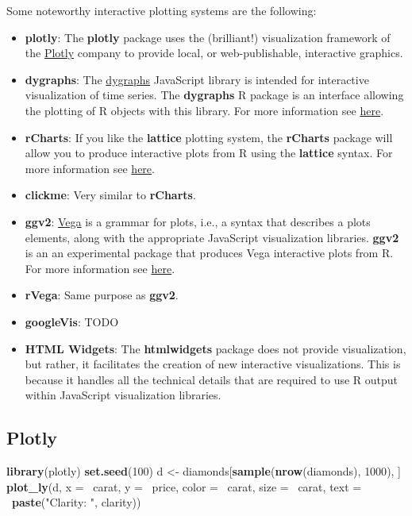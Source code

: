 \documentclass[]{book}
\newenvironment{Shaded}{\begin{snugshade}}{\end{snugshade}}
\newcommand{\KeywordTok}[1]{\textcolor[rgb]{0.13,0.29,0.53}{\textbf{{#1}}}}
\newcommand{\DataTypeTok}[1]{\textcolor[rgb]{0.13,0.29,0.53}{{#1}}}
\newcommand{\DecValTok}[1]{\textcolor[rgb]{0.00,0.00,0.81}{{#1}}}
\newcommand{\StringTok}[1]{\textcolor[rgb]{0.31,0.60,0.02}{{#1}}}
\newcommand{\NormalTok}[1]{{#1}}
\theoremstyle{definition}
\theoremstyle{definition}
\theoremstyle{remark}
\begin{document}
Some noteworthy interactive plotting systems are the following:

\begin{itemize}
\item
  \textbf{plotly}: The \textbf{plotly} package \citep{plotly} uses the
  (brilliant!) visualization framework of the \href{}{Plotly} company to
  provide local, or web-publishable, interactive graphics.
\item
  \textbf{dygraphs}: The \href{http://dygraphs.com/}{dygraphs}
  JavaScript library is intended for interactive visualization of time
  series. The \textbf{dygraphs} R package is an interface allowing the
  plotting of R objects with this library. For more information see
  \href{https://rstudio.github.io/dygraphs/}{here}.
\item
  \textbf{rCharts}: If you like the \textbf{lattice} plotting system,
  the \textbf{rCharts} package will allow you to produce interactive
  plots from R using the \textbf{lattice} syntax. For more information
  see \href{http://rdatascience.io/rCharts/}{here}.
\item
  \textbf{clickme}: Very similar to \textbf{rCharts}.
\item
  \textbf{ggv2}: \href{https://vega.github.io/vega/}{Vega} is a grammar
  for plots, i.e., a syntax that describes a plots elements, along with
  the appropriate JavaScript visualization libraries. \textbf{ggv2} is
  an an experimental package that produces Vega interactive plots from
  R. For more information see
  \href{https://github.com/metagraf/rVega}{here}.
\item
  \textbf{rVega}: Same purpose as \textbf{ggv2}.
\item
  \textbf{googleVis}: TODO
\item
  \textbf{HTML Widgets}: The \textbf{htmlwidgets} package does not
  provide visualization, but rather, it facilitates the creation of new
  interactive visualizations. This is because it handles all the
  technical details that are required to use R output within JavaScript
  visualization libraries.
\end{itemize}

\subsection{Plotly}\label{plotly}

\begin{Shaded}
\begin{Highlighting}[]
\KeywordTok{library}\NormalTok{(plotly)}
\KeywordTok{set.seed}\NormalTok{(}\DecValTok{100}\NormalTok{)}
\NormalTok{d <-}\StringTok{ }\NormalTok{diamonds[}\KeywordTok{sample}\NormalTok{(}\KeywordTok{nrow}\NormalTok{(diamonds), }\DecValTok{1000}\NormalTok{), ]}
\KeywordTok{plot_ly}\NormalTok{(d, }\DataTypeTok{x =} \NormalTok{~carat, }\DataTypeTok{y =} \NormalTok{~price, }\DataTypeTok{color =} \NormalTok{~carat,}
        \DataTypeTok{size =} \NormalTok{~carat, }\DataTypeTok{text =} \NormalTok{~}\KeywordTok{paste}\NormalTok{(}\StringTok{"Clarity: "}\NormalTok{, clarity))}
\end{Highlighting}
\end{Shaded}
\end{document}
